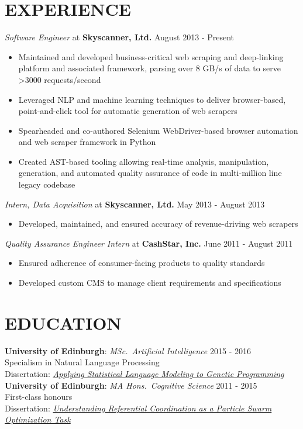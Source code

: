 \documentclass[line, margin]{res}
\begin{document}
\address{+44 771 966 3016 | chase@chasestevens.com}

\begin{resume}

\section{EXPERIENCE}
\textit{Software Engineer} at \textbf{Skyscanner, Ltd.} \hfill August 2013 - Present
\begin{itemize}[leftmargin=10pt]
\item Maintained and developed business-critical web scraping and deep-linking platform and associated framework, parsing over 8 GB/s of data to serve \textgreater 3000 requests/second
\item Leveraged NLP and machine learning techniques to deliver browser-based, point-and-click tool for automatic generation of web scrapers
\item Spearheaded and co-authored Selenium WebDriver-based browser automation and web scraper framework in Python
\item Created AST-based tooling allowing real-time analysis, manipulation, generation, and automated quality assurance of code in multi-million line legacy codebase
\end{itemize}
\textit{Intern, Data Acquisition} at \textbf{Skyscanner, Ltd.} \hfill May 2013 - August 2013
\begin{itemize}[leftmargin=10pt]
\item Developed, maintained, and ensured accuracy of revenue-driving web scrapers
\end{itemize}
\textit{Quality Assurance Engineer Intern} at \textbf{CashStar, Inc.} \hfill June 2011 - August 2011
\begin{itemize}[leftmargin=10pt]
\item Ensured adherence of consumer-facing products to quality standards
\item Developed custom CMS to manage client requirements and specifications
\end{itemize}

\section{EDUCATION}
\textbf{University of Edinburgh}: \textit{MSc.\ Artificial Intelligence} \hfill 2015 - 2016\\
Specialism in Natural Language Processing \\
Dissertation: \textit{\href{http://www.chasestevens.com/papers/msc_dissertation.pdf}{Applying Statistical Language Modeling to Genetic Programming}}\\[5pt]
\textbf{University of Edinburgh}: \textit{MA Hons.\ Cognitive Science} \hfill 2011 - 2015\\
First-class honours\\
Dissertation: \textit{\href{http://www.chasestevens.com/papers/undergrad_dissertation.pdf}{Understanding Referential Coordination as a Particle Swarm Optimization Task}}


\end{resume}
\end{document}
